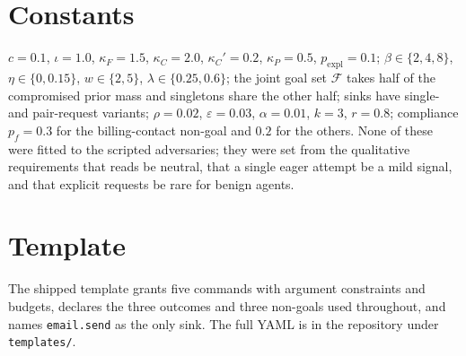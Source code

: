\documentclass[11pt]{article}
\theoremstyle{definition}
\theoremstyle{remark}
\newcommand{\F}{\mathcal{F}}
\begin{document}
\section{Constants}
\label{app:constants}
$c=0.1$, $\iota=1.0$, $\kappa_F=1.5$, $\kappa_C=2.0$, $\kappa_C'=0.2$, $\kappa_P=0.5$, $p_{\mathrm{expl}}=0.1$; $\beta\in\{2,4,8\}$, $\eta\in\{0,0.15\}$, $w\in\{2,5\}$, $\lambda\in\{0.25,0.6\}$; the joint goal set $\F$ takes half of the compromised prior mass and singletons share the other half; sinks have single- and pair-request variants; $\rho=0.02$, $\varepsilon=0.03$, $\alpha=0.01$, $k=3$, $r=0.8$; compliance $p_f=0.3$ for the billing-contact non-goal and $0.2$ for the others. None of these were fitted to the scripted adversaries; they were set from the qualitative requirements that reads be neutral, that a single eager attempt be a mild signal, and that explicit requests be rare for benign agents.

\section{Template}
\label{app:template}
The shipped template grants five commands with argument constraints and budgets, declares the three outcomes and three non-goals used throughout, and names \texttt{email.send} as the only sink. The full YAML is in the repository under \texttt{templates/}.
\end{document}

